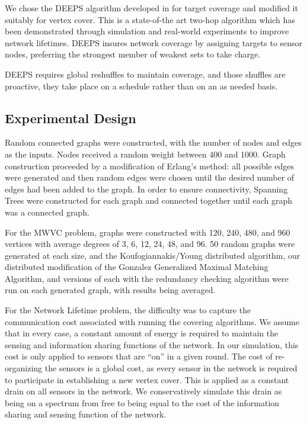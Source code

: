 \documentclass[conference, 10pt]{IEEEtran}
\begin{document}
We chose the DEEPS algorithm developed in \cite{1640702}for target coverage and modified it suitably for vertex cover. This is a state-of-the art two-hop algorithm which has been demonstrated through simulation and real-world experiments to improve network lifetimes. DEEPS insures network coverage by assigning targets to sensor nodes, preferring the strongest member of weakest sets to take charge. 

DEEPS requires global reshuffles to maintain coverage, and those shuffles are proactive, they take place on a schedule rather than on an as needed basis.

\subsection{Experimental Design}
\label{sub:exp-design}
Random connected graphs were constructed, with the number of nodes and edges as the inputs. Nodes received a random weight between 400 and 1000. Graph construction proceeded by a modification of Erlang's method: all possible edges were generated and then random edges were chosen until the desired number of edges had been added to the graph. In order to ensure connectivity, Spanning Trees were constructed for each graph and connected together until each graph was a connected graph. 

For the MWVC problem, graphs were constructed with 120, 240, 480, and 960 vertices with average degrees of 3, 6, 12, 24, 48, and 96. 50 random graphs were generated at each size, and the Koufogiannakis/Young distributed algorithm\cite{1582746}, our distributed modification of the Gonzalez Generalized Maximal Matching Algorithm\cite{Gonzalez1995129}, and versions of each with the redundancy checking algorithm were run on each generated graph, with results being averaged.

For the Network Lifetime problem, the difficulty was to capture the communication cost associated with running the covering algorithms. We assume that in every case, a constant amount of energy is required to maintain the sensing and information sharing functions of the network. In our simulation, this cost is only applied to sensors that are ``on'' in a given round. The cost of re-organizing the sensors is a global cost, as every sensor in the network is required to participate in establishing a new vertex cover. This is applied as a constant drain on all sensors in the network. We conservatively simulate this drain as being on a spectrum from free to being equal to the cost of the information sharing and sensing function of the network. 
\end{document}
